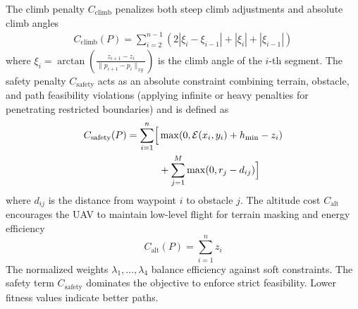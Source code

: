 \documentclass[final,5p,times]{elsarticle}
\begin{document}
The climb penalty $C_{\text{climb}}$ penalizes both steep climb adjustments and absolute climb angles
\begin{equation}
\begin{aligned}
C_{\text{climb}}(P) = \sum_{i=2}^{n-1} \left( 2|\xi_i - \xi_{i-1}| + |\xi_i| + |\xi_{i-1}| \right)
\end{aligned}
\end{equation}
where $\xi_i = \arctan\left(\frac{z_{i+1} - z_i}{\|p_{i+1} - p_i\|_{xy}}\right)$ is the climb angle of the $i$-th segment. The safety penalty $C_{\text{safety}}$ acts as an absolute constraint combining terrain, obstacle, and path feasibility violations (applying infinite or heavy penalties for penetrating restricted boundaries) and is defined as
\begin{equation}
\begin{aligned}
C_{\text{safety}}(P) = \sum_{i=1}^{n} \Bigl[ &\max(0, \mathcal{E}(x_i, y_i) + h_{\min} - z_i) \\
&+ \sum_{j=1}^{M} \max(0, r_j - d_{ij}) \Bigr]
\end{aligned}
\end{equation}
where $d_{ij}$ is the distance from waypoint $i$ to obstacle $j$.
The altitude cost $C_{\text{alt}}$ encourages the UAV to maintain low-level flight for terrain masking and energy efficiency
\begin{equation}
C_{\text{alt}}(P) = \sum_{i=1}^{n} z_i
\end{equation}
The normalized weights $\lambda_1, \ldots, \lambda_4$ balance efficiency against soft constraints.
The safety term $C_{\text{safety}}$ dominates the objective to enforce strict feasibility.
Lower fitness values indicate better paths.
\end{document}
